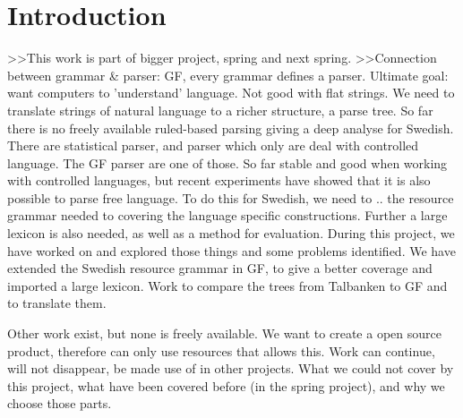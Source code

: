 \documentclass{report}
\begin{document}
\section{Introduction} 
>>This work is part of bigger project, spring and next spring.
>>Connection between grammar & parser: GF, every grammar defines a parser.
Ultimate goal: want computers to 'understand' language. Not good with flat strings.
We need to translate strings of natural language to a richer structure,
a parse tree. So far there is no
freely available ruled-based parsing giving a deep analyse for Swedish.
There are statistical parser, and parser which only are deal with controlled language.
The GF parser are one of those. 
So far stable and good when working with controlled languages, but recent experiments
have showed that it is also possible to parse free language.
To do this for Swedish, we need to  .. the resource grammar needed to covering
the language specific constructions. Further a large lexicon is also needed, as well
as a method for evaluation.
During this project, we have worked on and explored those things and some problems identified.
We have extended the Swedish resource grammar in GF, to give a better coverage and imported
a large lexicon. Work to compare the trees from Talbanken to GF and to translate them.



Other work exist, but none is freely available. We want to create a open source
product, therefore can only use resources that allows this. Work can continue,
will not disappear, be made use of in other projects.
What we could not cover by this project, what have been covered before (in
the spring project), and why we choose those parts.
\end{document}
